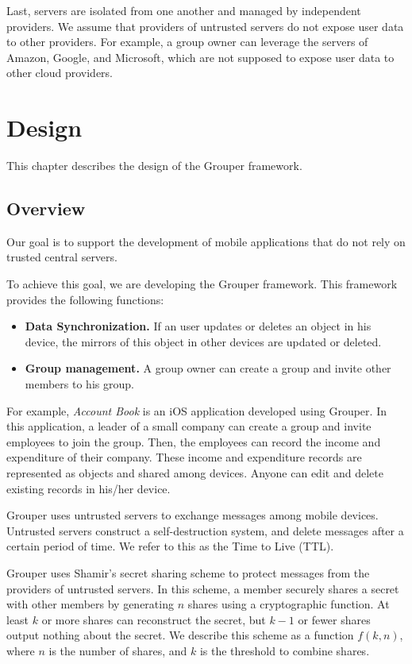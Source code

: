 \documentclass[a4paper,11pt]{report}
\begin{document}
Last, servers are isolated from one another and managed by independent providers.
We assume that providers of untrusted servers do not expose user data to other providers.
For example, a group owner can leverage the servers of Amazon, Google, and Microsoft, which are not supposed to expose user data to other cloud providers.

\chapter{Design} \label{chapter:design}

This chapter describes the design of the Grouper framework.

\section{Overview} \label{section:overview}

Our goal is to support the development of mobile applications that do not rely on trusted central servers.

To achieve this goal, we are developing the Grouper framework.
This framework provides the following functions:

\begin{itemize}[leftmargin=7mm]
	\setlength{\itemsep}{1pt}
	\setlength{\parskip}{0pt}
	\setlength{\parsep}{0pt}
	\item \textbf{Data Synchronization.} 
	If an user updates or deletes an object in his device, the mirrors of this object in other devices are updated or deleted.
	\item \textbf{Group management.} 
	A group owner can create a group and invite other members to his group.
\end{itemize}

For example, \emph{Account Book} is an iOS application developed using Grouper. 
In this application, a leader of a small company can create a group and invite employees to join the group. 
Then, the employees can record the income and expenditure of their company.
These income and expenditure records are represented as objects and shared among devices.
Anyone can edit and delete existing records in his/her device.

Grouper uses untrusted servers to exchange messages among mobile devices.
Untrusted servers construct a self-destruction system, and delete messages after a certain period of time.
We refer to this as the Time to Live (TTL).

Grouper uses Shamir's secret sharing scheme to protect messages from the providers of untrusted servers.
In this scheme, a member securely shares a secret with other members by generating $n$ shares using a cryptographic function\cite{smith2013layered}. 
At least $k$ or more shares can reconstruct the secret, but $k-1$ or fewer shares output nothing about the secret\cite{pang2005new}. 
We describe this scheme as a function ${f(k, n)}$, where $n$ is the number of shares, and $k$ is the threshold to combine shares. 
\end{document}
